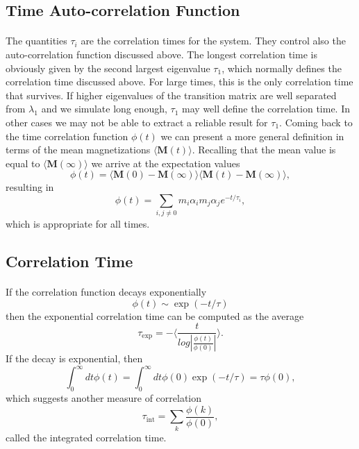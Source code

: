 \subsection*{Time Auto-correlation Function}

\paragraph{}

The quantities $\tau_i$ are the correlation times for the system. They control also the auto-correlation function 
discussed above.  The longest correlation time is obviously given by the second largest
eigenvalue $\tau_1$, which normally defines the correlation time discussed above. For large times, this is the 
only correlation time that survives. If higher eigenvalues of the transition matrix are well separated from 
$\lambda_1$ and we simulate long enough,  $\tau_1$ may well define the correlation time. 
In other cases we may not be able to extract a reliable result for $\tau_1$. 
Coming back to the time correlation function $\phi(t)$ we can present a more general definition in terms
of the mean magnetizations $ \langle \mathbf{M}(t) \rangle$. Recalling that the mean value is equal 
to $ \langle \mathbf{M}(\infty) \rangle$ we arrive at the expectation values
\[
\phi(t) =\langle \mathbf{M}(0)-\mathbf{M}(\infty)\rangle \langle \mathbf{M}(t)-\mathbf{M}(\infty)\rangle,
\]
resulting in
\[
\phi(t) =\sum_{i,j\ne 0}m_i\alpha_im_j\alpha_je^{-t/\tau_i},
\]
which is appropriate for all times.



\subsection*{Correlation Time}

\paragraph{}

If the correlation function decays exponentially
\[ \phi (t) \sim \exp{(-t/\tau)}\]
then the exponential correlation time can be computed as the average
\[   \tau_{\mathrm{exp}}  =  -\langle  \frac{t}{log|\frac{\phi(t)}{\phi(0)}|} \rangle. \]
If the decay is exponential, then
\[  \int_0^{\infty} dt \phi(t)  = \int_0^{\infty} dt \phi(0)\exp{(-t/\tau)}  = \tau \phi(0),\] 
which  suggests another measure of correlation
\[   \tau_{\mathrm{int}} = \sum_k \frac{\phi(k)}{\phi(0)}, \]
called the integrated correlation time.



